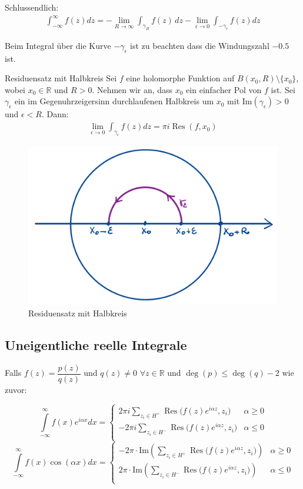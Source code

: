 \documentclass[a4paper,10pt]{article}
\DeclareMathOperator{\Res}{Res}
\def\Im{\text{Im}}
\begin{document}
Schlussendlich:
\begin{align*} \int_{-\infty}^\infty f(z)dz= -\lim_{R\to\infty}\int_{\gamma_R}f(z)\,dz -\lim_{\epsilon\to0}\int_{-\gamma_\epsilon} f(z)dz  \end{align*}

Beim Integral über die Kurve $-\gamma_{\epsilon}$ ist zu beachten dass die Windungszahl $-0.5$ ist.

\begin{subbox}{Residuensatz mit Halbkreis}
  Sei \(f\) eine holomorphe Funktion auf \(B(x_0,R)\setminus\{x_0\}\), wobei \(x_0\in\mathbb{R}\) und \(R>0\). Nehmen wir an, dass \(x_0\) ein einfacher Pol von \(f\) ist. Sei \(\gamma_\epsilon\) ein im Gegenuhrzeigersinn durchlaufenen Halbkreis um \(x_0\) mit \(\Im(\gamma_\epsilon)>0\) und \(\epsilon< R\). Dann:
  \begin{align*} \lim_{\epsilon \to 0} \int_{\gamma_{\epsilon}} f(z) dz = \pi i \operatorname{Res}(f,x_0) \end{align*}

\end{subbox}

\begin{figure}[H]
  \centering 
  \includegraphics[width=0.5\linewidth]{assets/4-4-3.png}
  \caption{Residuensatz mit Halbkreis}
\end{figure}

\subsection{Uneigentliche reelle Integrale}
	
Falls \( f(z) = \dfrac{p(z)}{q(z)} \) und \( q(z) \neq 0\)  \(\forall z \in \mathbb{R}\) und \( \deg(p) \leqslant \deg(q) - 2 \) wie zuvor:

  \[ \displaystyle \int\limits_{-\infty}^\infty f(x) e^{i\alpha x}dx = \begin{cases}
  \displaystyle 2\pi i \sum\limits_{z_i \in H^+} \Res\big(f(z)e^{i\alpha z}, z_i\big)	&	\alpha \geqslant 0\\
  \displaystyle -2\pi i \sum_{z_i \in H^-} \Res\big(f(z)e^{i\alpha z}, z_i\big)		&	\alpha \leqslant 0\\
\end{cases} \]
  \[ \displaystyle \int\limits_{-\infty}^\infty f(x) \cos(\alpha x)dx = \begin{cases}
    
  \displaystyle -2\pi\cdot \text{Im}\left(\sum_{z_i \in H^+} \Res\big(f(z)e^{i\alpha z},  z_i\big) \right)
  &	\alpha \geqslant 0\\
  \displaystyle 2\pi\cdot \text{Im}\left(\sum_{z_i \in H^-} \Res\big(f(z)e^{i\alpha z},  z_i\big) \right)
  &	\alpha \leqslant 0\\
\end{cases} \]
\end{document}
